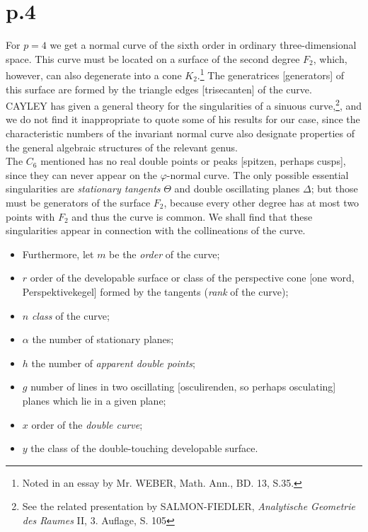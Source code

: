 \documentclass[leqno]{article}
\begin{document}
\section{p.4}
For $ p = 4 $ we get a normal curve of the sixth order in ordinary three-dimensional space. This curve must be located on a surface of the second degree $ F_2 $, which, however, can also degenerate into a cone $ K_2 $.\footnote{Noted in an essay by Mr. WEBER, Math. Ann., BD. 13, S.35.} The generatrices [generators] of this surface are formed by the triangle edges [trisecanten] of the curve. \\
CAYLEY has given a general theory for the singularities of a sinuous curve,\footnote{See the related presentation by SALMON-FIEDLER, \textit{Analytische Geometrie des Raumes} II, 3. Auflage, S. 105}, and we do not find it inappropriate to quote some of his results for our case, since the characteristic numbers of the invariant normal curve also designate properties of the general algebraic structures of the relevant genus. \\
The $ C_6 $ mentioned has no real double points or peaks [spitzen, perhaps cusps], since they can never appear on the $\varphi$-normal curve. The only possible essential singularities are \textit{stationary tangents} $ \Theta $ and double oscillating planes $ \Delta $; but those must be generators of the surface $ F_2 $, because every other degree has at most two points with $ F_2 $ and thus the curve is common. We shall find that these singularities appear in connection with the collineations of the curve. 
\begin{itemize}[label={}]
	\item Furthermore, let $ m $ be the  \textit{order} of the curve; 
	\item $ r $ order of the developable surface or class of the perspective cone [one word, Perspektivekegel] formed by the tangents (\textit{rank} of the curve);
	\item $ n $ \textit{class} of the curve;
	\item $\alpha$ the number of stationary planes;
	\item $ h $ the number of \textit{apparent double points};
	\item $ g $ number of lines in two oscillating [osculirenden, so perhaps osculating] planes which lie in a given plane;
	\item $ x $ order of the \textit{double curve};
	\item $ y $ the class of the double-touching developable surface.
\end{itemize}
\end{document}
